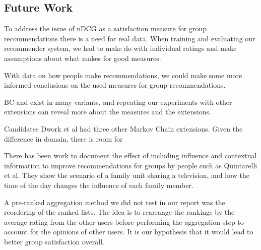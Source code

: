 \subsection{Future Work}\label{sec:futurework}

To address the issue of nDCG as a satisfaction measure for group recommendations there is a need for real data. When training and evaluating our recommender system, we had to make do with individual ratings and make assumptions about what makes for good measures.

With data on how people make recommendations, we could make some more informed conclusions on the used measures for group recommendations.

BC and \MC exist in many variants, and repeating our experiments with other extensions can reveal more about the measures and the extensions.

Candidates Dwork et al had three other Markov Chain extensions. Given the difference in domain, there is room for 


There has been work to document the effect of including influence and contextual information to improve recommendations for groups by people such as Quintarelli et al\cite{Quintarelli2016}. They show the scenario of a family unit sharing a television, and how the time of the day changes the influence of each family member.


A pre-ranked aggregation method we did not test in our report was the reordering of the ranked lists.
The idea is to rearrange the rankings by the average rating from the other users before performing the aggregation step to account for the opinions of other users. It is our hypothesis that it would lead to better group satisfaction overall.